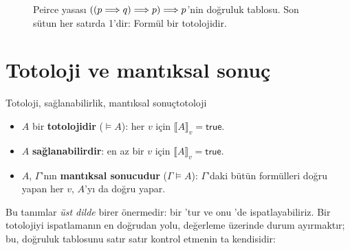 \begin{figure}[htbp]
\centering
{}
\caption{Peirce yasası $((p \Longrightarrow q) \Longrightarrow p) \Longrightarrow p$'nin doğruluk
tablosu. Son sütun her satırda 1'dir: Formül bir totolojidir.}
\label{fig:peirce-tablo}
\end{figure}

\section{Totoloji ve mantıksal sonuç}\label{sec:totoloji}

\begin{tanim}{Totoloji, sağlanabilirlik, mantıksal sonuç}{totoloji}
\begin{itemize}
  \item $A$ bir \textbf{totolojidir} ($\models A$): her $v$ için
        $\lBrack A \rBrack_v = \mathsf{true}$.
  \item $A$ \textbf{sağlanabilirdir}: en az bir $v$ için
        $\lBrack A \rBrack_v = \mathsf{true}$.
  \item $A$, $\Gamma$'nın \textbf{mantıksal sonucudur} ($\Gamma \models A$):
        $\Gamma$'daki bütün formülleri doğru yapan her $v$, $A$'yı da
        doğru yapar.
\end{itemize}
\end{tanim}


\noindent Bu tanımlar \emph{üst dilde} birer önermedir: 
bir 'tur ve onu \Lean{}'de ispatlayabiliriz. Bir totolojiyi
ispatlamanın en doğrudan yolu, değerleme üzerinde durum ayırmaktır;
bu, doğruluk tablosunu satır satır kontrol etmenin ta kendisidir:

